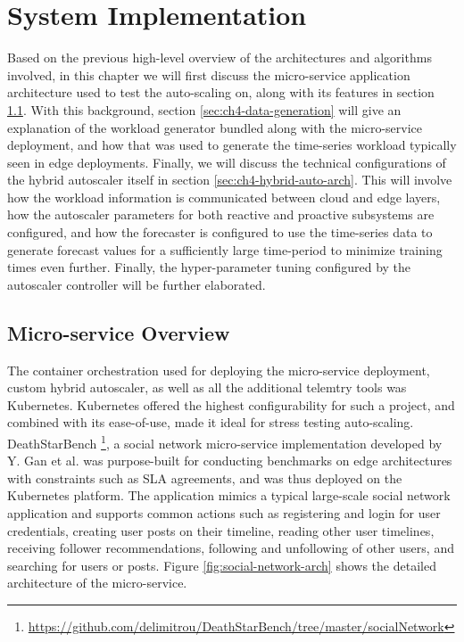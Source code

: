\clearpage

\def\chaptertitle{System Implementation}

\lhead{\emph{\chaptertitle}}

\chapter{\chaptertitle}
\label{ch:experimental-setup}

Based on the previous high-level overview of the architectures and algorithms involved, in this chapter we will first discuss the micro-service application architecture used to test the auto-scaling on, along with its features in section \ref{sec:ch4-microservice-overview}. With this background, section \ref{sec:ch4-data-generation} will give an explanation of the workload generator bundled along with the micro-service deployment, and how that was used to generate the time-series workload typically seen in edge deployments. Finally, we will discuss the technical configurations of the hybrid autoscaler itself in section \ref{sec:ch4-hybrid-auto-arch}. This will involve how the workload information is communicated between cloud and edge layers, how the autoscaler parameters for both reactive and proactive subsystems are configured, and how the forecaster is configured to use the time-series data to generate forecast values for a sufficiently large time-period to minimize training times even further. Finally, the hyper-parameter tuning configured by the autoscaler controller will be further elaborated.

\section{Micro-service Overview}
\label{sec:ch4-microservice-overview}

The container orchestration used for deploying the micro-service deployment, custom hybrid autoscaler, as well as all the additional telemtry tools was Kubernetes. Kubernetes offered the highest configurability for such a project, and combined with its ease-of-use, made it ideal for stress testing auto-scaling. DeathStarBench \footnote{\url{https://github.com/delimitrou/DeathStarBench/tree/master/socialNetwork}}, a social network micro-service implementation developed by Y. Gan et al. \cite{gan2019open} was purpose-built for conducting benchmarks on edge architectures with constraints such as SLA agreements, and was thus deployed on the Kubernetes platform. The application mimics a typical large-scale social network application and supports common actions such as registering and login for user credentials, creating user posts on their timeline, reading other user timelines, receiving follower recommendations, following and unfollowing of other users, and searching for users or posts. Figure \ref{fig:social-network-arch} shows the detailed architecture of the micro-service.\par

